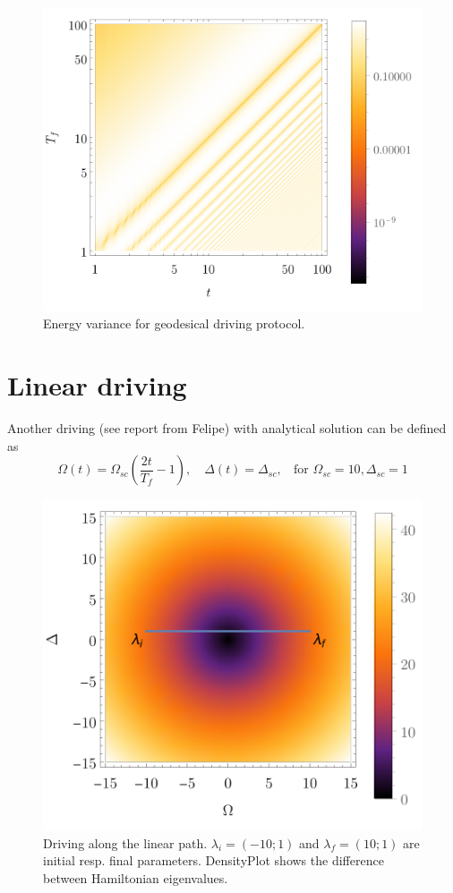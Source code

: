 \begin{figure}[H]
    \centering
    \includegraphics[scale=1.2]{../img/densVar.pdf}
    \caption{Energy variance for geodesical driving protocol.}
    \label{fig:densVar}
\end{figure}

\newpage 
\section{Linear driving}
Another driving (see report from Felipe) with analytical solution can be defined as
\begin{equation}
    \Omega(t)=\Omega_{sc}\left(\frac{2t}{T_f}-1\right),\quad \Delta(t)=\Delta_{sc}, \;\;\text{ for } \Omega_{sc}=10, \Delta_{sc}=1
    \label{eq:linearDrivingdef}
\end{equation}
\begin{figure}[H]
    \centering
    \includegraphics[scale=1.2]{../img/drivingLin.pdf}
    \caption{Driving along the linear path. $\lambda_i=(-10;1)$ and $\lambda_f=(10;1)$ are initial resp. final parameters. DensityPlot shows the difference between Hamiltonian eigenvalues.}
    \label{fig:driving}
\end{figure}

